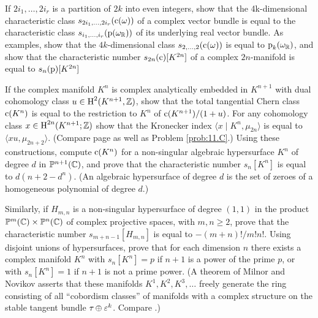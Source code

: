 \documentclass[../main]{subfiles}
\begin{document}
\begin{problem}\label{prob:16.C}
 If $2 i_{1}, \ldots, 2 i_{r}$ is a partition of $2 k$ into even integers, show that the 4k-dimensional characteristic class $s_{2i_{1}, \ldots, 2 i_{r}}(\operatorname{c}(\omega))$ of a complex vector bundle is equal to the characteristic class $s_{i_{1}, \ldots, i_{r}}(\operatorname{p}(\omega_{\mathbb{R}}))$ of its underlying real vector bundle. As examples, show that the $4 k$-dimensional class $s_{2, \ldots, 2}(\operatorname{c}(\omega))$ is equal to $\operatorname{p}_{k}(\omega_{\mathbb{R}})$, and show that the characteristic number $s_{2 n}(\operatorname{c})[K^{2 n}]$ of a complex $2 n$-manifold is equal to $s_{n}(\operatorname{p})[K^{2 n}]$
\end{problem}

\begin{problem}\label{prob:16.D}
If the complex manifold $K^{n}$ is complex analytically embedded in $K^{n+1}$ with dual cohomology class $u \in \operatorname{H}^{2}(K^{n+1}, \mathbb{Z})$, show that the total tangential Chern class $\operatorname{c}(K^{n})$ is equal to the restriction to $K^{n}$ of $\operatorname{c}(K^{n+1}) /(1+u)$. For any cohomology class $x \in \operatorname{H}^{2n}(K^{n+1} ; \mathbb{Z})$ show that the Kronecker index $\langle x \mid K^{n}, \mu_{2 n}\rangle$ is equal to $\langle xu, \mu_{2 n+2}\rangle$. (Compare page \pageref{cor:11.04} as well as Problem \ref{prob:11.C}.) Using these constructions, compute $\operatorname{c}(K^{n})$ for a non-singular algebraic hypersurface $K^{n}$ of degree $d$ in $\mathbb{P}^{n+1}(\mathbb{C})$, and prove that the characteristic number $s_{n}[K^{n}]$ is equal to $d(n+2-d^{n})$. (An algebraic hypersurface of degree $d$ is the set of zeroes of a homogeneous polynomial of degree $d$.)

\end{problem}

\begin{problem}\label{prob:16.E}
Similarly, if $H_{m, n}$ is a non-singular hypersurface of degree $(1,1)$ in the product $\mathbb{P}^{m}(\mathbb{C}) \times \mathbb{P}^{n}(\mathbb{C})$ of complex projective spaces, with $m, n \geq 2$, prove that the characteristic number $s_{m+n-1}[H_{m, n}]$ is equal to $-(m+n) ! / m ! n !$. Using disjoint unions of hypersurfaces, prove that for each dimension $n$ there exists a complex manifold $K^{n}$ with $s_{n}[K^{n}]=p$ if $n+1$ is a power of the prime $p$, or with $s_{n}[K^{n}]=1$ if $n+1$ is not a prime power. (A theorem of Milnor and Novikov asserts that these manifolds $K^{1}, K^{2}, K^{3}, \ldots$ freely generate the ring consisting of all ``cobordism classes'' of manifolds with a complex structure on the stable tangent bundle $\tau_{} \oplus \varepsilon^{k}$. Compare \cite{stongcobordism1968}.)

\end{problem}
\end{document}
